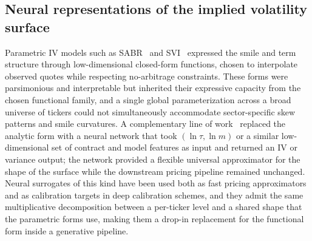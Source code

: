 \subsection{Neural representations of the implied volatility surface}

Parametric IV models such as SABR~\cite{hagan2002} and SVI~\cite{gatheral2004} expressed the smile and term structure through low-dimensional closed-form functions, chosen to interpolate observed quotes while respecting no-arbitrage constraints. These forms were parsimonious and interpretable but inherited their expressive capacity from the chosen functional family, and a single global parameterization across a broad universe of tickers could not simultaneously accommodate sector-specific skew patterns and smile curvatures. A complementary line of work~\cite{horvath2021,bayer2019} replaced the analytic form with a neural network that took $(\ln\tau,\ln m)$ or a similar low-dimensional set of contract and model features as input and returned an IV or variance output; the network provided a flexible universal approximator for the shape of the surface while the downstream pricing pipeline remained unchanged. Neural surrogates of this kind have been used both as fast pricing approximators and as calibration targets in deep calibration schemes, and they admit the same multiplicative decomposition between a per-ticker level and a shared shape that the parametric forms use, making them a drop-in replacement for the functional form inside a generative pipeline.
